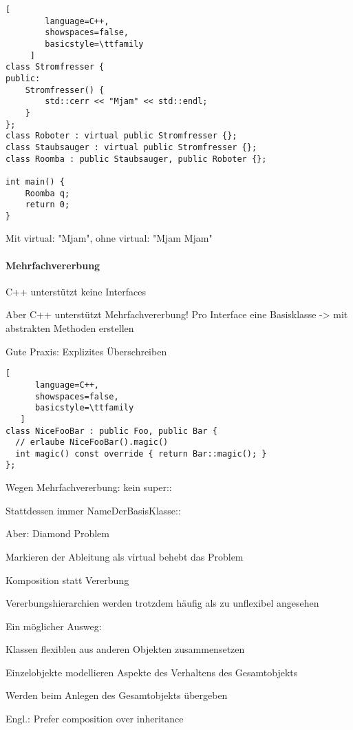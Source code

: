 \documentclass[10pt]{article}
\begin{document}
\begin{lstlisting}[
        language=C++,
        showspaces=false,
        basicstyle=\ttfamily
     ]
class Stromfresser {
public:
    Stromfresser() {
        std::cerr << "Mjam" << std::endl;
    }
};
class Roboter : virtual public Stromfresser {};
class Staubsauger : virtual public Stromfresser {};
class Roomba : public Staubsauger, public Roboter {};

int main() {
    Roomba q;
    return 0;
}
\end{lstlisting}
Mit virtual: "Mjam", ohne virtual: "Mjam Mjam"


\paragraph{Mehrfachvererbung}

\begin{itemize*}
  \item C++ unterstützt keine Interfaces
  \item Aber C++ unterstützt Mehrfachvererbung! Pro Interface eine Basisklasse -> mit abstrakten Methoden erstellen
  \item Gute Praxis: Explizites Überschreiben
  \begin{lstlisting}[
      language=C++,
      showspaces=false,
      basicstyle=\ttfamily
   ]
class NiceFooBar : public Foo, public Bar {
  // erlaube NiceFooBar().magic()
  int magic() const override { return Bar::magic(); }
};
\end{lstlisting}
  
  \begin{itemize*}
    \item Wegen Mehrfachvererbung: kein super::
    \item Stattdessen immer NameDerBasisKlasse::
  \end{itemize*}
  \item Aber: Diamond Problem
  \begin{itemize*}
    \item Markieren der Ableitung als virtual behebt das Problem
  \end{itemize*}
\end{itemize*}

Komposition statt Vererbung
\begin{itemize*}
  \item Vererbungshierarchien werden trotzdem häufig als zu unflexibel angesehen
  \item Ein möglicher Ausweg:
  \begin{itemize*}
    \item Klassen flexiblen aus anderen Objekten zusammensetzen
    \item Einzelobjekte modellieren Aspekte des Verhaltens des Gesamtobjekts
    \item Werden beim Anlegen des Gesamtobjekts übergeben
  \end{itemize*}
  \item Engl.: Prefer composition over inheritance
\end{itemize*}
\end{document}
